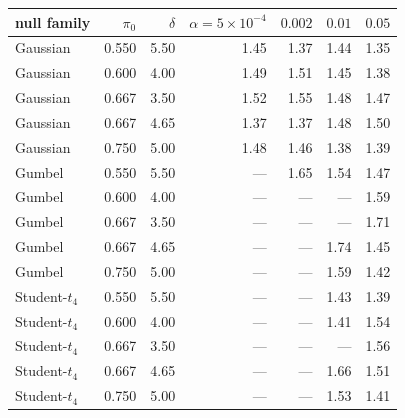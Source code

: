\begin{tabular}{lrrrrrr}
\toprule
null family & $\pi_0$ & $\delta$ & $\alpha=5\times10^{-4}$ & $0.002$ & $0.01$ & $0.05$ \\
\midrule
Gaussian & 0.550 & 5.50 & 1.45 & 1.37 & 1.44 & 1.35 \\
Gaussian & 0.600 & 4.00 & 1.49 & 1.51 & 1.45 & 1.38 \\
Gaussian & 0.667 & 3.50 & 1.52 & 1.55 & 1.48 & 1.47 \\
Gaussian & 0.667 & 4.65 & 1.37 & 1.37 & 1.48 & 1.50 \\
Gaussian & 0.750 & 5.00 & 1.48 & 1.46 & 1.38 & 1.39 \\
\addlinespace
Gumbel & 0.550 & 5.50 & --- & 1.65 & 1.54 & 1.47 \\
Gumbel & 0.600 & 4.00 & --- & --- & --- & 1.59 \\
Gumbel & 0.667 & 3.50 & --- & --- & --- & 1.71 \\
Gumbel & 0.667 & 4.65 & --- & --- & 1.74 & 1.45 \\
Gumbel & 0.750 & 5.00 & --- & --- & 1.59 & 1.42 \\
\addlinespace
Student-$t_4$ & 0.550 & 5.50 & --- & --- & 1.43 & 1.39 \\
Student-$t_4$ & 0.600 & 4.00 & --- & --- & 1.41 & 1.54 \\
Student-$t_4$ & 0.667 & 3.50 & --- & --- & --- & 1.56 \\
Student-$t_4$ & 0.667 & 4.65 & --- & --- & 1.66 & 1.51 \\
Student-$t_4$ & 0.750 & 5.00 & --- & --- & 1.53 & 1.41 \\
\bottomrule
\end{tabular}
